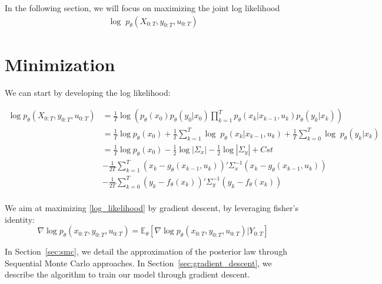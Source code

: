 \documentclass[10pt,a4paper]{report}
\begin{document}
In the following section, we will focus on maximizing the joint log likelihood
\begin{align}
        \log \; p_{\theta}(X_{0:T}, y_{0:T}, u_{0:T})
        \label{log_likelihood}
\end{align}

\section{Minimization}
We can start by developing the log likelihood:

\begin{align*}
    \log p_{\theta}(X_{0:T}, y_{0:T}, u_{0:T}) & = \frac{1}{T} \log\left(p_\theta(x_0)p_\theta(y_0 | x_0)\prod_{k=1}^{T} p_{\theta}(x_k | x_{k-1}, u_k) p_{\theta}(y_k | x_k)\right)                                                                               \\
                                                & = \frac{1}{T} \log p_\theta(x_0) + \frac{1}{T} \sum_{k=1}^{T} \log \; p_{\theta}(x_k | x_{k-1}, u_k) + \frac{1}{T} \sum_{k=0}^{T} \log \; p_{\theta}(y_k | x_k)                                                                               \\
                                                & = \frac{1}{T} \log p_\theta(x_0) -\frac{1}{2} \log|\Sigma_x| -\frac{1}{2} \log|\Sigma_y| + Cst                                                                                                                   \\
                                                & - \frac{1}{2T} \sum_{k=1}^{T}(x_k - g_\theta(x_{k-1}, u_{k}))' \Sigma_x^{-1} (x_k - g_\theta(x_{k-1}, u_{k}))                                                              \\
                                                & - \frac{1}{2T} \sum_{k=0}^{T}(y_k - f_\theta(x_k))' \Sigma_y^{-1} (y_k - f_\theta(x_k))                                                                                    \\
\end{align*}

We aim at maximizing \ref{log_likelihood} by gradient descent, by leveraging fisher's identity:
$$
\nabla \log p_\theta(x_{0:T}, y_{0:T}, u_{0:T}) = \mathbb{E}_\theta \left[\nabla\log p_\theta(x_{0:T}, y_{0:T}, u_{0:T}) | Y_{0:T} \right]
$$

In Section~\ref{sec:smc}, we detail the approximation of the posterior law through Sequential Monte Carlo approaches.
In Section~\ref{sec:gradient_descent}, we describe the algorithm to train our model through gradient descent.
\end{document}
